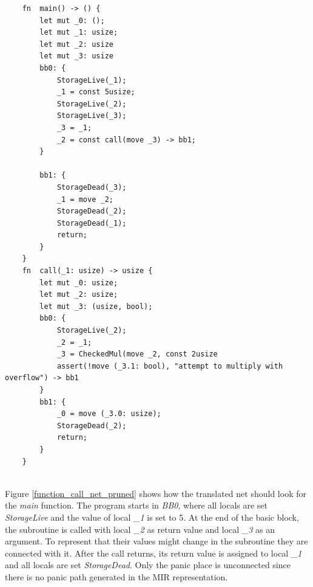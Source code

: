 \begin{lstlisting}
    fn  main() -> () {
        let mut _0: ();
        let mut _1: usize;
        let mut _2: usize
        let mut _3: usize
        bb0: {
            StorageLive(_1);
            _1 = const 5usize;
            StorageLive(_2);
            StorageLive(_3);
            _3 = _1;
            _2 = const call(move _3) -> bb1;
        }
    
        bb1: {
            StorageDead(_3);
            _1 = move _2;
            StorageDead(_2);
            StorageDead(_1);
            return;
        }
    }
    fn  call(_1: usize) -> usize {
        let mut _0: usize; 
        let mut _2: usize; 
        let mut _3: (usize, bool); 
        bb0: {
            StorageLive(_2); 
            _2 = _1; 
            _3 = CheckedMul(move _2, const 2usize 
            assert(!move (_3.1: bool), "attempt to multiply with overflow") -> bb1 
        }
        bb1: {
            _0 = move (_3.0: usize); 
            StorageDead(_2); 
            return; 
        }
    }
    
\end{lstlisting}

Figure \ref{function_call_net_pruned} shows how the translated net should look for the \textit{main} function.
The program starts in \textit{BB0}, where all locals are set \textit{StorageLive} and the value of local \textit{\_1} is set to 5.
At the end of the basic block, the subroutine is called with local \textit{\_2} as return value and local \textit{\_3} as an argument.
To represent that their values might change in the subroutine they are connected with it.
After the call returns, its return value is assigned to local \textit{\_1} and all locals are set \textit{StorageDead}.
Only the panic place is unconnected since there is no panic path generated in the MIR representation.

